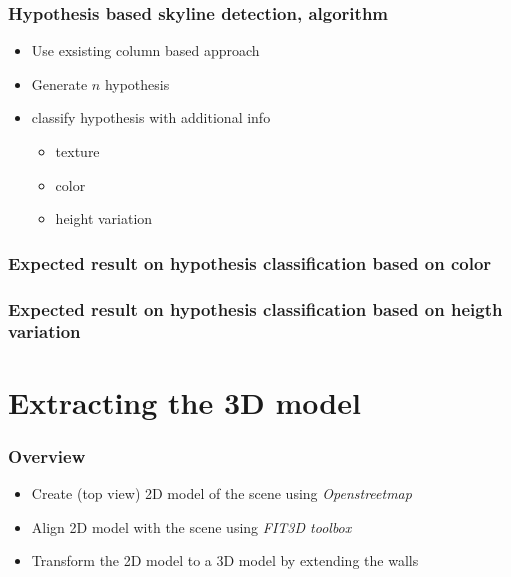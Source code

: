 \documentclass{beamer}
\begin{document}
\frame
{
	\frametitle{Hypothesis based skyline detection, algorithm}
	\begin{itemize}
	\item  <+-| alert@+> Use exsisting column based approach
	\item  <+-| alert@+> Generate $n$ hypothesis
	\item  <+-| alert@+> classify hypothesis with additional info
		\begin{itemize}
		\item  <+-| alert@+> texture 
		\item  <+-| alert@+> color
		\item  <+-| alert@+> height variation 
		\end{itemize}
	\end{itemize}
}

\frame
{
	\frametitle{Expected result on hypothesis classification based on color}
}

\frame
{
	\frametitle{Expected result on hypothesis classification based on heigth variation}
}





\section{Extracting the 3D model}
\frame
{
	\frametitle{Overview}
	\begin{itemize}
	\item  <+-| alert@+> Create (top view) 2D model of the scene using \emph{Openstreetmap}
	\item  <+-| alert@+> Align 2D model with the scene using \emph{FIT3D toolbox}
	\item  <+-| alert@+> Transform the 2D model to a 3D model by extending the walls
	\end{itemize}
}
\end{document}
